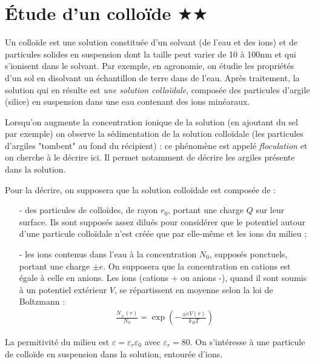 \documentclass{report}
\begin{document}
\newpage

\section*{Étude d'un colloïde $\bigstar\bigstar$}

Un colloïde est une solution constituée d'un solvant (de l'eau et des ions) et de particules solides en suspension dont la taille peut varier de 10 à 100nm et qui s'ionisent dans le solvant. Par exemple, en agronomie, on étudie les propriétés d'un sol en disolvant un échantillon de terre dans de l'eau. Après traitement, la solution qui en résulte est \textit{une solution colloïdale}, composée des particules d'argile (silice) en suspension dans une eau contenant des ions minéaraux. 

Lorsqu'on augmente la concentration ionique de la solution (en ajoutant du sel par exemple) on observe la sédimentation de la solution colloïdale (les particules d'argiles "tombent" au fond du récipient) : ce phénomène est appelé \textit{floculation} et on cherche à le décrire ici. Il permet notamment de décrire les argiles présente dans la solution.


Pour la décrire, on supposera que la solution colloïdale est composée de :
\begin{itemize}
	\item[-] des particules de colloïdes, de rayon $r_0$, portant une charge $Q$ sur leur surface. Ils sont supposés assez dilués pour considérer que le potentiel autour d'une particule colloïdale n'est créée que par elle-même et les ions du milieu ;
	\item[-] les ions contenus dans l'eau à la concentration $N_0$, supposés ponctuels, portant une charge $\pm e$. On supposera que la concentration en cations est égale à celle en anions. Les ions (cations + ou anions -), quand il sont soumis à un potentiel extérieur $V$, se répartissent en moyenne selon la loi de Boltzmann :
\begin{align*}
	\frac{N_{\pm}(r)}{N_0}=\exp\left(-\frac{\pm eV(r)}{k_BT} \right) 
\end{align*}
\end{itemize}
La permitivité du milieu est $\varepsilon=\varepsilon_r\varepsilon_0$ avec $\varepsilon_r=80$. On s'intéresse à une particule de colloïde en suspension dans la solution, entourée d'ions.
\end{document}
